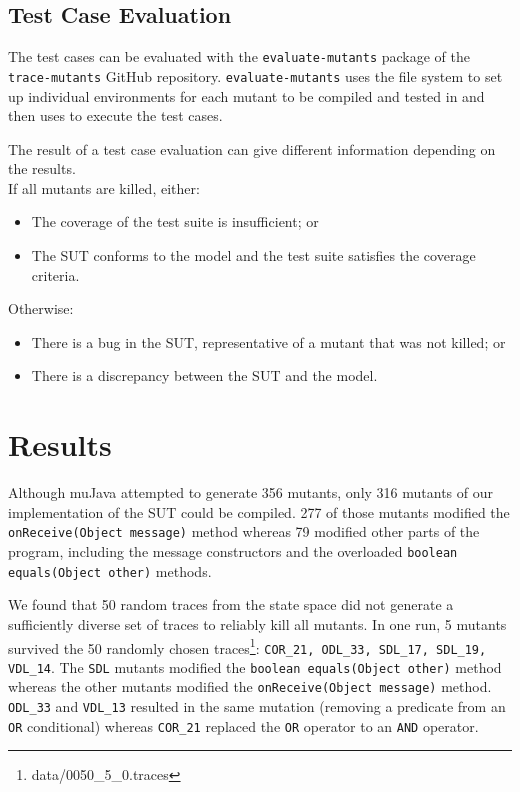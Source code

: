 \documentclass{article}
\begin{document}
		\subsection{Test Case Evaluation}
			\label{sec:method_testing}
			The test cases can be evaluated with the \texttt{evaluate-mutants} package of the \texttt{trace-mutants} GitHub repository. \texttt{evaluate-mutants} uses the file system to set up individual environments for each mutant to be compiled and tested in and then uses \citeauthor{sbt} to execute the test cases.

			The result of a test case evaluation can give different information depending on the results. \\
			If all mutants are killed, either:
				\begin{itemize}
					\item The coverage of the test suite is insufficient; or
					\item The SUT conforms to the model and the test suite satisfies the coverage criteria.
				\end{itemize}
			Otherwise:
				\begin{itemize}
					\item There is a bug in the SUT, representative of a mutant that was not killed; or
					\item There is a discrepancy between the SUT and the model.
				\end{itemize}

	\section{Results}
		Although muJava attempted to generate 356 mutants, only 316 mutants of our implementation of the SUT could be compiled. 277 of those mutants modified the \texttt{onReceive(Object message)} method whereas 79 modified other parts of the program, including the message constructors and the overloaded \texttt{boolean equals(Object other)} methods.

		We found that 50 random traces from the state space did not generate a sufficiently diverse set of traces to reliably kill all mutants.
		In one run, 5 mutants survived the 50 randomly chosen traces\footnote{data/0050\_5\_0.traces}: \texttt{COR\_21, ODL\_33, SDL\_17, SDL\_19, VDL\_14}. The \texttt{SDL} mutants modified the \texttt{boolean equals(Object other)} method whereas the other mutants modified the \texttt{onReceive(Object message)} method. \texttt{ODL\_33} and \texttt{VDL\_13} resulted in the same mutation (removing a predicate from an \texttt{OR} conditional) whereas \texttt{COR\_21} replaced the \texttt{OR} operator to an \texttt{AND} operator.
\end{document}
